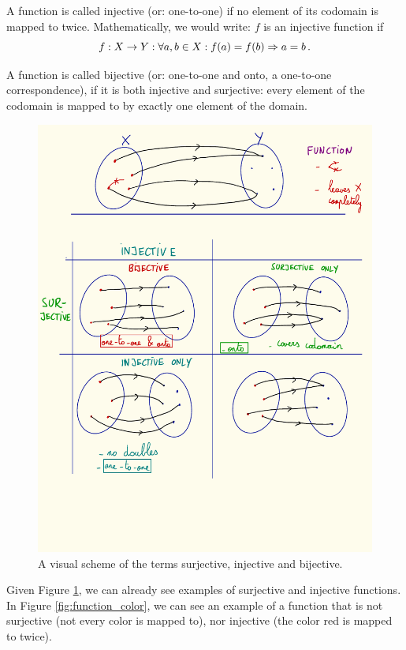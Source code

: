         A function is called injective (or: one-to-one) if no element of its codomain is mapped to twice. Mathematically, we would write: $f$ is an injective function if
        \begin{equation}
            f: X \rightarrow Y: \forall a, b \in X: f(a) = f(b) \Rightarrow a = b \thinspace .
        \end{equation}

        A function is called bijective (or: one-to-one and onto, a one-to-one correspondence), if it is both injective and surjective: every element of the codomain is mapped to by exactly one element of the domain. \\

        \begin{figure}[H] \centering
            \includegraphics{images/sur_in_bi}
            \caption{A visual scheme of the terms surjective, injective and bijective.}
            \label{fig:sur_in_bi}
        \end{figure}

        Given Figure \ref{fig:sur_in_bi}, we can already see examples of surjective and injective functions. In Figure \ref{fig:function_color}, we can see an example of a function that is not surjective (not every color is mapped to), nor injective (the color red is mapped to twice). \\
